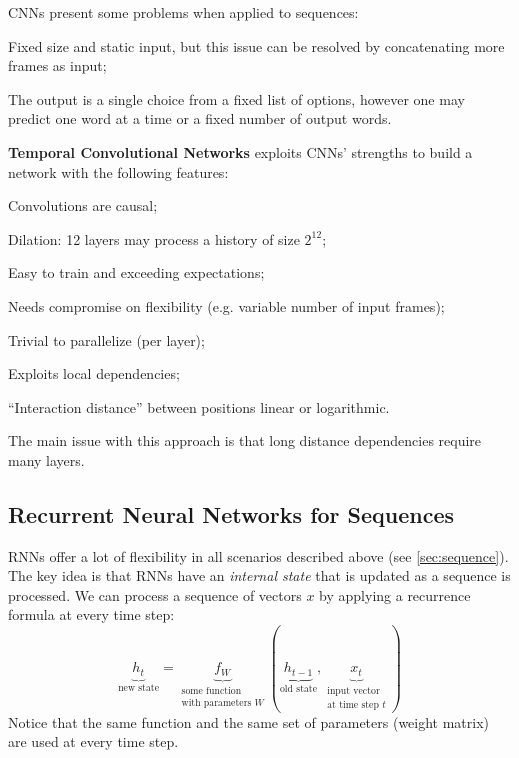 CNNs present some problems when applied to sequences:
\begin{myitem}
    \item Fixed size and static input, but this issue can be resolved by concatenating more frames as input;
    \item The output is a single choice from a fixed list of options, however one may predict one word at a time or a fixed number of output words.
\end{myitem}

\textbf{Temporal Convolutional Networks} exploits CNNs' strengths to build a network with the following features:
\begin{myitem}
    \item Convolutions are causal;
    \item Dilation: 12 layers may process a history of size $2^{12}$;
    \item Easy to train and exceeding expectations;
    \item Needs compromise on flexibility (e.g. variable number of input frames);
    \item Trivial to parallelize (per layer);
    \item Exploits local dependencies;
    \item ``Interaction distance'' between positions linear or logarithmic.
\end{myitem}
The main issue with this approach is that long distance dependencies require many layers.


\subsection{Recurrent Neural Networks for Sequences}\label{sec:seq-rnn}

RNNs offer a lot of flexibility in all scenarios described above (see \ref{sec:sequence}).\\
The key idea is that RNNs have an \textit{internal state} that is updated as a sequence is processed. We can process a sequence of vectors $x$ by applying a recurrence formula at every time step:
\begin{equation}\label{eq:recurrence-rnn}
    \underbrace{h_t}_{\text{new state}} = \underbrace{f_W}_{\substack{\text{some function} \\ \text{with parameters } W}} (\underbrace{h_{t-1}}_{\text{old state}}, \underbrace{x_t}_{\substack{\text{input vector} \\ \text{at time step } t}})
\end{equation}
Notice that the same function and the same set of parameters (weight matrix) are used at every time step.


